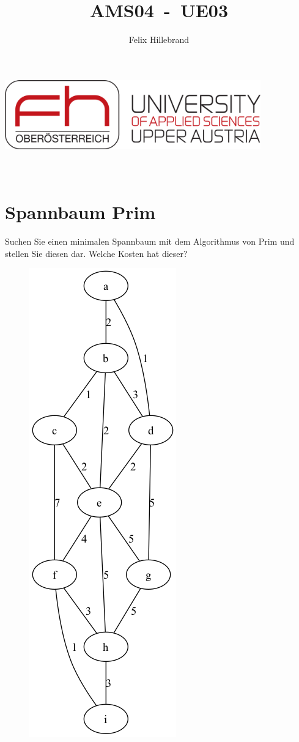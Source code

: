 \documentclass[a4paper,11pt]{report}
\author{Felix Hillebrand}
\newcommand{\coverpage}{
    \thispagestyle{cover}
    \pagenumbering{roman} %
    \begin{center}
        {\includegraphics[height=3cm]{fh-logo.png}}\\[1cm]
        {\LARGE \thetitle}\\[0.5cm]
        {\large \theauthor}\\
    \end{center}
    \tableofcontents
    \clearpage
}
\begin{document}

    \title{AMS04~-~UE03}
    \coverpage

    \clearpage
    \pagestyle{main}


    \chapter{Spannbaum Prim}
    \label{ch:spbprim}
    Suchen Sie einen minimalen Spannbaum mit dem Algorithmus von Prim und stellen Sie diesen dar.
    Welche Kosten hat dieser?

    \begin{figure}[htbp]
        \centering
        \includegraphics[height=0.3\textheight]{a01a_graph}
        \label{fig:a01_graph}
    \end{figure}
\end{document}
